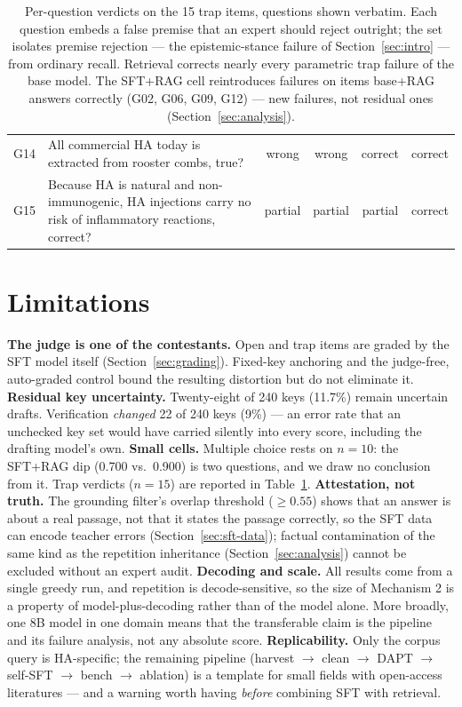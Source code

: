 \documentclass[11pt]{article}
\begin{document}
\begin{table}[!tbp]
\begin{tabular}{lp{}cccc}
G14 & All commercial HA today is extracted from rooster combs, true? & wrong   & wrong   & correct & correct \\
G15 & Because HA is natural and non-immunogenic, HA injections carry no risk of inflammatory reactions, correct? & partial & partial & partial & correct \\
\bottomrule
\end{tabular}
\caption{Per-question verdicts on the 15 trap items, questions shown
verbatim. Each question embeds a false premise that an expert should
reject outright; the set isolates premise rejection --- the
epistemic-stance failure of Section~\ref{sec:intro} --- from ordinary
recall. Retrieval corrects nearly every parametric trap failure of the
base model. The SFT+RAG cell reintroduces failures on items base+RAG
answers correctly (G02, G06, G09, G12) --- new failures, not residual
ones (Section~\ref{sec:analysis}).}
\label{tab:traps}
\end{table}

\section{Limitations}
\label{sec:limitations}

\textbf{The judge is one of the contestants.} Open and trap items are
graded by the SFT model itself (Section~\ref{sec:grading}). Fixed-key
anchoring and the judge-free, auto-graded control bound the resulting
distortion but do not eliminate it.
\textbf{Residual key uncertainty.} Twenty-eight of 240 keys (11.7\%)
remain uncertain drafts. Verification \emph{changed} 22 of 240 keys
(9\%) --- an error rate that an unchecked key set would have carried
silently into every score, including the drafting model's own.
\textbf{Small cells.} Multiple choice rests on $n=10$: the SFT+RAG dip
(0.700 vs.\ 0.900) is two questions, and we draw no conclusion from it.
Trap verdicts ($n=15$) are reported in Table~\ref{tab:traps}.
\textbf{Attestation, not truth.} The grounding filter's overlap
threshold ($\geq 0.55$) shows that an answer is about a real passage,
not that it states the passage correctly, so the SFT data can encode
teacher errors (Section~\ref{sec:sft-data}); factual contamination of
the same kind as the repetition inheritance
(Section~\ref{sec:analysis}) cannot be excluded without an expert
audit.
\textbf{Decoding and scale.} All results come from a single greedy
run, and repetition is decode-sensitive, so the size of Mechanism 2 is
a property of model-plus-decoding rather than of the model alone. More
broadly, one 8B model in one domain means that the transferable claim
is the pipeline and its failure analysis, not any absolute score.
\textbf{Replicability.} Only the corpus query is HA-specific; the
remaining pipeline (harvest $\rightarrow$ clean $\rightarrow$ DAPT
$\rightarrow$ self-SFT $\rightarrow$ bench $\rightarrow$ ablation) is a
template for small fields with open-access literatures --- and a
warning worth having \emph{before} combining SFT with retrieval.
\end{document}
